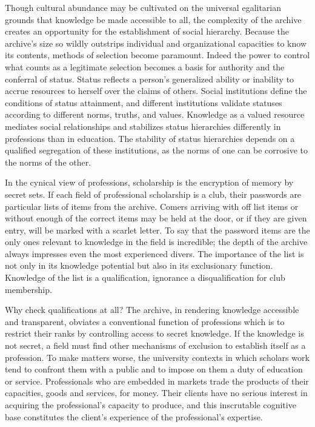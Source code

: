 \documentclass[]{book}
\theoremstyle{definition}
\theoremstyle{definition}
\theoremstyle{definition}
\theoremstyle{remark}
\begin{document}
Though cultural abundance may be cultivated on the universal egalitarian
grounds that knowledge be made accessible to all, the complexity of the
archive creates an opportunity for the establishment of social
hierarchy. Because the archive's size so wildly outstrips individual and
organizational capacities to know its contents, methods of selection
become paramount. Indeed the power to control what counts as a
legitimate selection becomes a basis for authority and the conferral of
status. Status reflects a person's generalized ability or inability to
accrue resources to herself over the claims of others. Social
institutions define the conditions of status attainment, and different
institutions validate statuses according to different norms, truths, and
values. Knowledge as a valued resource mediates social relationships and
stabilizes status hierarchies differently in professions than in
education. The stability of status hierarchies depends on a qualified
segregation of these institutions, as the norms of one can be corrosive
to the norms of the other.

In the cynical view of professions, scholarship is the encryption of
memory by secret sets. If each field of professional scholarship is a
club, their passwords are particular lists of items from the archive.
Comers arriving with off list items or without enough of the correct
items may be held at the door, or if they are given entry, will be
marked with a scarlet letter. To say that the password items are the
only ones relevant to knowledge in the field is incredible; the depth of
the archive always impresses even the most experienced divers. The
importance of the list is not only in its knowledge potential but also
in its exclusionary function. Knowledge of the list is a qualification,
ignorance a disqualification for club membership.

Why check qualifications at all? The archive, in rendering knowledge
accessible and transparent, obviates a conventional function of
professions which is to restrict their ranks by controlling access to
secret knowledge. If the knowledge is not secret, a field must find
other mechanisms of exclusion to establish itself as a profession. To
make matters worse, the university contexts in which scholars work tend
to confront them with a public and to impose on them a duty of education
or service. Professionals who are embedded in markets trade the products
of their capacities, goods and services, for money. Their clients have
no serious interest in acquiring the professional's capacity to produce,
and this inscrutable cognitive base \citep[152]{DiMaggio1983Iron}
constitutes the client's experience of the professional's expertise.
\end{document}
